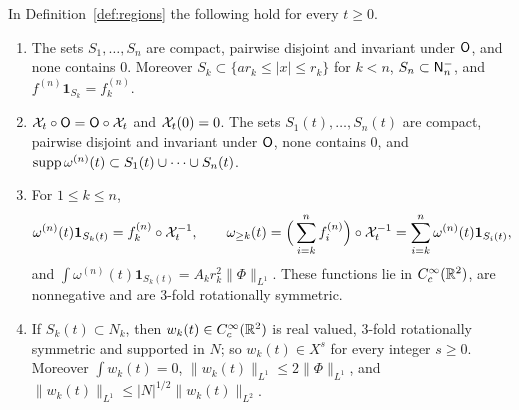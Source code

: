 \begin{lemma}
\label{lem:regions-basic}
In Definition~\ref{def:regions} the following hold for every $t\ge0$.
\begin{enumerate}[label=\textup{(\arabic*)},beginpenalty=10000]
\item The sets $S_1,\dots,S_n$ are compact, pairwise disjoint and invariant
  under $\mathsf{O}$, and none contains $0$. Moreover
  $S_k\subset\{ar_k\le|x|\le r_k\}$ for $k<n$, $S_n\subset\mathsf{N}^{-}_n$, and
  $f^{(n)}\mathbf 1_{S_k}=f^{(n)}_k$.
\item $\mathcal{X}_t\circ\mathsf{O}=\mathsf{O}\circ\mathcal{X}_t$ and $\mathcal{X}_t(0)=0$. The sets
  $S_1(t),\dots,S_n(t)$ are compact, pairwise disjoint and invariant under
  $\mathsf{O}$, none contains $0$, and
  $\operatorname{supp}\omega^{(n)}(t)\subset S_1(t)\cup\dots\cup S_n(t)$.
\item For $1\le k\le n$,
  \begin{equation}
  \label{eq:omega-ge}
  \omega^{(n)}(t)\mathbf 1_{S_k(t)}=f^{(n)}_k\circ\mathcal{X}_t^{-1},\qquad
  \omega_{\ge k}(t)=\Big(\sum_{i=k}^nf^{(n)}_i\Big)\circ\mathcal{X}_t^{-1}
  =\sum_{i=k}^n\omega^{(n)}(t)\mathbf 1_{S_i(t)},
  \end{equation}
  and $\int\omega^{(n)}(t)\mathbf 1_{S_k(t)}=A_kr_k^2\|\Phi\|_{L^1}$. These
  functions lie in $C_c^\infty(\mathbb{R}^2)$, are nonnegative and are $3$-fold
  rotationally symmetric.
\item If $S_k(t)\subset N_k$, then $w_k(t)\in C_c^\infty(\mathbb{R}^2)$ is real valued,
  $3$-fold rotationally symmetric and supported in $N$; so $w_k(t)\in X^s$ for every integer
  $s\ge0$. Moreover $\int w_k(t)=0$, $\|w_k(t)\|_{L^1}\le2\|\Phi\|_{L^1}$, and
  $\|w_k(t)\|_{L^1}\le|N|^{1/2}\|w_k(t)\|_{L^2}$.
\end{enumerate}
\end{lemma}

